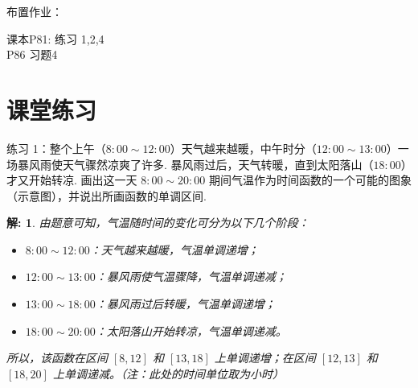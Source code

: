 \documentclass[aspectratio=169,13pt,t] {beamer}
\newtheorem*{solve}{解:}
\theoremstyle{definition}
\begin{document}
\begin{frame}
	{布置作业：}
	
	课本P81: 练习 1,2,4\\
	P86 习题4
\end{frame}

\section{课堂练习}

\begin{frame}
	练习 1：整个上午（\(8:00 \sim 12:00\)）天气越来越暖，中午时分（\(12:00 \sim 13:00\)）一场暴风雨使天气骤然凉爽了许多. 暴风雨过后，天气转暖，直到太阳落山（\(18:00\)）才又开始转凉. 画出这一天 \(8:00 \sim 20:00\) 期间气温作为时间函数的一个可能的图象（示意图），并说出所画函数的单调区间.
	
	\begin{solve}
	由题意可知，气温随时间的变化可分为以下几个阶段：
	\begin{itemize}
		\item \(8:00 \sim 12:00\)：天气越来越暖，气温单调递增；
		\item \(12:00 \sim 13:00\)：暴风雨使气温骤降，气温单调递减；
		\item \(13:00 \sim 18:00\)：暴风雨过后转暖，气温单调递增；
		\item \(18:00 \sim 20:00\)：太阳落山开始转凉，气温单调递减。
	\end{itemize}
	所以，该函数在区间 \([8, 12]\) 和 \([13, 18]\) 上单调递增；在区间 \([12, 13]\) 和 \([18, 20]\) 上单调递减。（注：此处的时间单位取为小时）
	\end{solve}
\end{frame}

\begin{frame}
	\begin{center}
	\end{center}
\end{frame}
\end{document}
